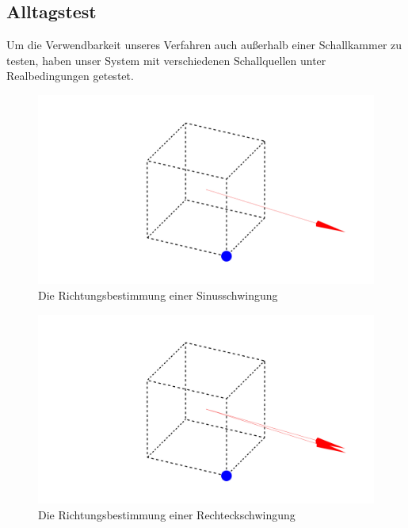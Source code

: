\subsection{Alltagstest} 
Um die Verwendbarkeit unseres Verfahren auch außerhalb einer Schallkammer zu testen, haben unser System mit verschiedenen Schallquellen unter Realbedingungen getestet.\\
\begin{minipage}{0.49\linewidth}
	\begin{figure}[H]
		\centering
		\includegraphics[width=\textwidth]{img/sine.png}
		\caption{Die Richtungsbestimmung einer Sinusschwingung}
		\label{fig:sine}
	\end{figure}
\end{minipage}\hfill
\begin{minipage}{0.49\linewidth}
   \begin{figure}[H]
   	\hfill
   	\centering
   	\includegraphics[width=\textwidth]{img/square.png}
   	\caption{Die Richtungsbestimmung einer Rechteckschwingung}
   	\label{fig:squre}
   \end{figure}
\end{minipage}
